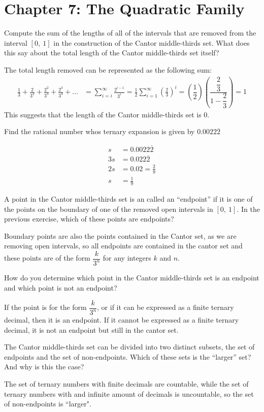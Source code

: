 \documentclass[12pt]{article}
\author{Warren Atkison}
\date{\today}
\newenvironment{exercise}[2][Exercise]{\begin{trivlist}
\item[\hskip \labelsep {\bfseries #1} \hskip \labelsep {\bfseries #2.}]}{\end{trivlist}}
\begin{document}
\fancyhf{}
\fancyhead[R]{\today}
\fancyfoot[R]{\thepage}
\section*{Chapter 7: The Quadratic Family}
\begin{exercise}{2}
	Compute the sum of the lengths of all of the intervals that are removed
from the interval $[0,~1]$ in the construction of the Cantor middle-thirds set.
What does this say about the total length of the Cantor middle-thirds set
itself?
\end{exercise}
The total length removed can be represented as the following sum:
\begin{align*}
	\frac{1}{3} + \frac{2}{3^2} + \frac{2^2}{3^3} + \frac{2^3}{3^4} +  \ldots &= \sum_{i = i}^{\infty} \frac{2^{i-1}}{3^i} = \frac{1}{2}\sum_{i=1}^{\infty} \left(\frac{2}{3}\right)^i
							     = \left(\dfrac{1}{2}\right)\left(\dfrac{\dfrac{2}{3}}{1 - \dfrac{2}{3}}\right)
							     = 1
\end{align*}
This suggests that the length of the Cantor middle-thirds set is 0.
\begin{exercise}{5}
	Find the rational number whos ternary expansion is given by $0.0022\overline{2}$
\end{exercise}
\begin{align*}
	s &= 0.0022\overline{2} \\
	3s &= 0.022\overline{2} \\
	2s &= 0.02 = \frac{2}{9} \\
	s &= \frac{1}{9}
\end{align*}
\begin{exercise}{23}
	A point in the Cantor middle-thirds set is an called an “endpoint” if it
is one of the points on the boundary of one of the removed open intervals in
$[0,~1]$. In the previous exercise, which of these points are endpoints?
\end{exercise}
Boundary points are also the points contained in the Cantor set, as we are removing open intervals, so all endpoints are contained in the cantor set and these points are of the form $\dfrac{k}{3^n}$ for any integers $k$ and $n$. 
\begin{exercise}{24}
	How do you determine which point in the Cantor middle-thirds set is an endpoint and which point is not an endpoint?
\end{exercise}
If the point is for the form $\dfrac{k}{3^n}$, or if it can be expressed as a finite ternary decimal, then it is an endpoint. If it cannot be expressed as a finite ternary decimal, it is not an endpoint but still in the cantor set.
\begin{exercise} {25}
	The Cantor middle-thirds set can be divided into two distinct subsets, the set of endpoints and the set of non-endpoints. Which of these sets is the “larger” set? And why is this the case?
\end{exercise}
	The set of ternary numbers with finite decimals are countable, while the set of ternary numbers with and infinite amount of decimals is uncountable, so the set of non-endpoints is ``larger".
\newpage
\end{document}
